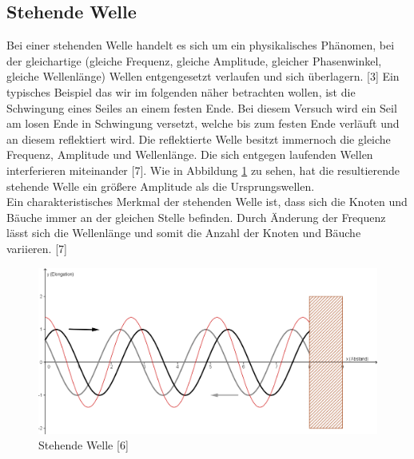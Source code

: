\documentclass[a4paper]{scrartcl}
\numberwithin{equation}{subsection}
\begin{document}
\subsection{Stehende Welle}
Bei einer stehenden Welle handelt es sich um ein physikalisches Phänomen, bei der gleichartige (gleiche Frequenz, gleiche Amplitude, gleicher Phasenwinkel, gleiche Wellenlänge) Wellen entgengesetzt verlaufen und sich überlagern. [3] Ein typisches Beispiel das wir im folgenden näher betrachten wollen, ist die Schwingung eines Seiles an einem festen Ende.
Bei diesem Versuch wird ein Seil am losen Ende in Schwingung versetzt, welche bis zum festen Ende verläuft und an diesem reflektiert wird. Die reflektierte Welle besitzt immernoch die gleiche Frequenz, Amplitude und Wellenlänge. Die sich entgegen laufenden Wellen interferieren miteinander [7]. Wie in Abbildung \ref{fig:steh-welle-print} zu sehen, hat die resultierende stehende Welle ein größere Amplitude als die Ursprungswellen.\\
Ein charakteristisches Merkmal der stehenden Welle ist, dass sich die Knoten und Bäuche immer an der gleichen Stelle befinden. Durch Änderung der Frequenz lässt sich die Wellenlänge und somit die Anzahl der Knoten und Bäuche variieren. [7]
\begin{figure}[H]
\includegraphics[width=12cm]{steh-welle-print}
\centering
\caption{Stehende Welle [6]}
\centering
\label{fig:steh-welle-print}

\end{figure}
\end{document}
